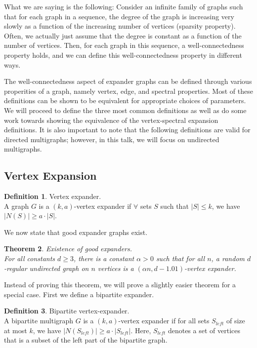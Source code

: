 \documentclass[11pt]{article}
\newtheorem{theorem}{Theorem}[section]
\theoremstyle{definition}
\newtheorem{definition}[theorem]{Definition}
\theoremstyle{definition}
\theoremstyle{definition}
\begin{document}
What we are saying is the following: Consider an infinite family of graphs such that for each graph in a sequence, the degree of the graph is increasing very slowly as a function of the increasing number of vertices (sparsity property). Often, we actually just assume that the degree is constant as a function of the number of vertices. Then, for each graph in this sequence, a well-connectedness property holds, and we can define this well-connectedness property in different ways.

The well-connectedness aspect of expander graphs can be defined through various properities of a graph, namely vertex, edge, and spectral properties. Most of these definitions can be shown to be equivalent for appropriate choices of parameters. We will proceed to define the three most common definitions as well as do some work towards showing the equivalence of the vertex-spectral expansion definitions. It is also important to note that the following definitions are valid for directed multigraphs; however, in this talk, we will focus on undirected multigraphs.


\subsection{Vertex Expansion}

\begin{definition} Vertex expander. \\
A graph $G$ is a $(k, a)$-vertex expander if $\forall$ sets $S$ such that $|S| \leq k$, we have $|N(S)| \geq a \cdot |S|$. 
\end{definition}

We now state that good expander graphs exist. 

\begin{theorem} Existence of good expanders.\\
For all constants $d \geq 3$, there is a constant $\alpha > 0$ such
that for all $n$, a random $d$-regular undirected graph on $n$ vertices
is a $(\alpha  n, d - 1.01)$-vertex expander. 
\end{theorem}

Instead of proving this theorem, we will prove a slightly easier theorem
for a special case. 
First we define a bipartite expander. 

\begin{definition} Bipartite vertex-expander. \\
A bipartite multigraph $G$ is a $(k, a)$-vertex expander if 
for all sets $S_{left}$ of size at most $k$, we have $|N(S_{left})| \geq a \cdot |S_{left}|$.
Here, $S_{left}$ denotes a set of vertices that is a subset of the left part of the bipartite graph.
\end{definition}
\end{document}
